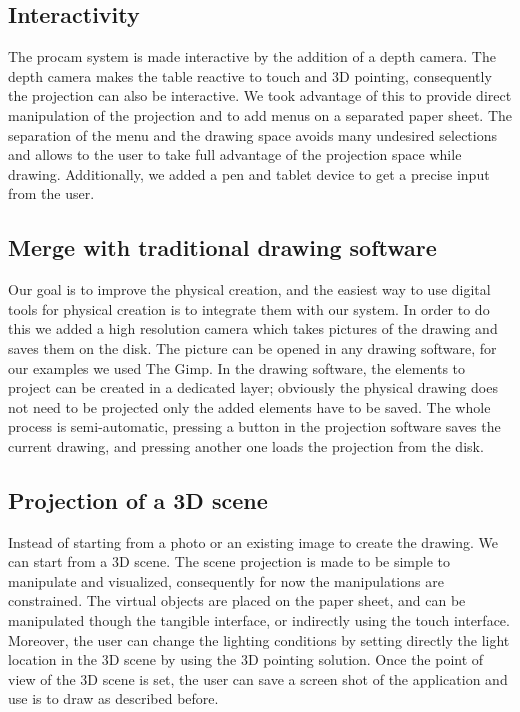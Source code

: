 \documentclass{article}
\begin{document}

\subsection{Interactivity}

The procam system is made interactive by the addition of a depth camera. The depth camera makes the table reactive to touch and 3D pointing, consequently the projection can also be interactive. We took advantage of this to provide direct manipulation of the projection and to add menus on a separated paper sheet. The separation of the menu and the drawing space avoids many undesired selections and allows to the user to take full advantage of the projection space while drawing. Additionally, we added a pen and tablet device to get a precise input from the user. 

\subsection{Merge with traditional drawing software}
Our goal is to improve the physical creation, and the easiest way to use digital tools for physical creation is to integrate them with our system. In order to do this we added a high resolution camera which takes pictures of the drawing and saves them on the disk. The picture can be opened in any drawing software, for our examples we used The Gimp. In the drawing software, the elements to project can be created in a dedicated layer; obviously the physical drawing does not need to be projected only the added elements have to be saved. The whole process is semi-automatic, pressing a button in the projection software saves the current drawing, and pressing another one loads the projection from the disk. 

\subsection{Projection of a 3D scene}
Instead of starting from a photo or an existing image to create the drawing. We can start from a 3D scene. The scene projection is made to be simple to manipulate and visualized, consequently for now the manipulations are constrained. The virtual objects are placed on the paper sheet, and can be manipulated though the tangible interface, or indirectly using the touch interface. Moreover, the user can change the lighting conditions by setting directly the light location in the 3D scene by using the 3D pointing solution. Once the point of view of the 3D scene is set, the user can save a screen shot of the application and use is to draw as described before. 
\end{document}
